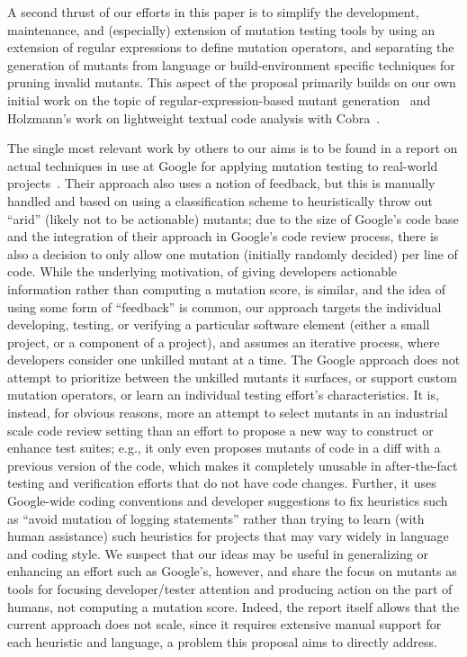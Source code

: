 A second thrust of our efforts in this paper is to simplify the
development, maintenance, and (especially) extension of mutation
testing tools by using an extension of regular expressions to define
mutation operators, and separating the generation of mutants from
language or build-environment specific techniques for pruning invalid
mutants.  This aspect of the proposal primarily builds on our own initial work on the topic of
regular-expression-based mutant generation~\cite{regexpMut} and
Holzmann's work on lightweight textual code analysis with
Cobra~\cite{Cobra}.

The single most relevant work by others to our aims is to be found in a
report on actual techniques in use at Google for applying mutation
testing to real-world projects~\cite{MutGoogle}.  Their approach also
uses a notion of feedback, but this is manually handled and based on
using a classification scheme to heuristically throw out ``arid''
(likely not to be actionable)
mutants; due to the size of Google's code base and the integration of
their approach in Google's code review process, there is also a
decision to only allow one mutation (initially randomly decided) per
line of code.  While the underlying motivation, of giving developers
actionable information rather than computing a mutation score, is
similar, and the idea of using some form of ``feedback'' is common,
our approach targets the individual developing, testing, or verifying a particular software
element (either a small project, or a component of a project), and
assumes an iterative process, where developers consider one unkilled
mutant at a time.  The Google approach does not attempt to prioritize
between the unkilled mutants it surfaces, or support custom mutation
operators, or learn an individual testing effort's characteristics.
It is, instead, for obvious reasons, more an attempt to select mutants
in an industrial scale code review setting than an effort to propose a
new way to construct or enhance test suites; e.g., it only even
proposes mutants of code in a diff with a previous version of the
code, which makes it completely unusable in after-the-fact testing and
verification efforts that do not have code changes.  Further, it uses
Google-wide coding conventions and developer suggestions to fix
heuristics such as ``avoid mutation of logging statements'' rather
than trying to learn (with human assistance) such heuristics for
projects that may vary widely in language and coding style.  We
suspect that our ideas may be useful in generalizing or enhancing an
effort such as Google's, however, and share the focus on mutants as
tools for focusing developer/tester attention and producing action on the
part of humans, not computing a mutation score.  Indeed, the report
itself allows that the current approach does not scale, since it
requires extensive manual support for each heuristic and language, a
problem this proposal aims to directly address.

